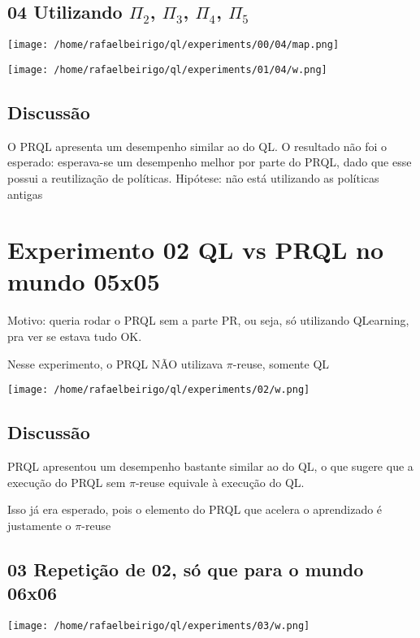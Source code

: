\documentclass[11pt]{article}
\begin{document}
\subsection{04 Utilizando $\Pi$$_2$, $\Pi$$_3$, $\Pi$$_4$, $\Pi$$_5$}
\label{sec-2.4}

\centerline{\texttt{[image: /home/rafaelbeirigo/ql/experiments/00/04/map.png]}}


\centerline{\texttt{[image: /home/rafaelbeirigo/ql/experiments/01/04/w.png]}}


\subsection{Discussão}
\label{sec-2.5}

O PRQL apresenta um desempenho similar ao do QL.
O resultado não foi o esperado: esperava-se um desempenho melhor por parte do PRQL,
dado que esse possui a reutilização de políticas.
Hipótese: não está utilizando as políticas antigas


\section{Experimento 02 QL vs PRQL no mundo 05x05}
\label{sec-3}

Motivo: queria rodar o PRQL sem a parte PR, ou seja, só utilizando
QLearning, pra ver se estava tudo OK.

Nesse experimento, o PRQL NÃO utilizava $\pi$-reuse, somente QL

\centerline{\texttt{[image: /home/rafaelbeirigo/ql/experiments/02/w.png]}}


\subsection{Discussão}
\label{sec-3.1}

PRQL apresentou um desempenho bastante similar ao do QL, o que sugere que a execução
do PRQL sem $\pi$-reuse equivale à execução do QL.

Isso já era esperado, pois o elemento do PRQL que acelera o aprendizado é justamente
o $\pi$-reuse


\subsection{03 Repetição de 02, só que para o mundo 06x06}
\label{sec-3.2}

\centerline{\texttt{[image: /home/rafaelbeirigo/ql/experiments/03/w.png]}}
\end{document}

